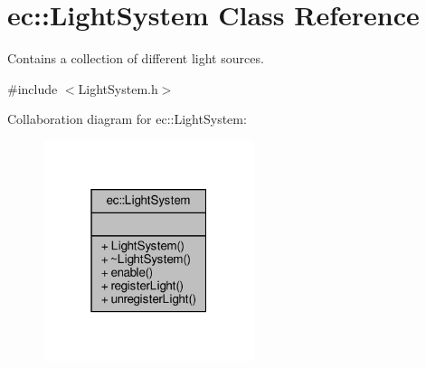 \hypertarget{classec_1_1_light_system}{}\section{ec\+:\+:Light\+System Class Reference}
\label{classec_1_1_light_system}


Contains a collection of different light sources.  




{\ttfamily \#include $<$Light\+System.\+h$>$}



Collaboration diagram for ec\+:\+:Light\+System\+:\nopagebreak
\begin{figure}[H]
\begin{center}
\leavevmode
\includegraphics[width=175pt]{classec_1_1_light_system__coll__graph}
\end{center}
\end{figure}
